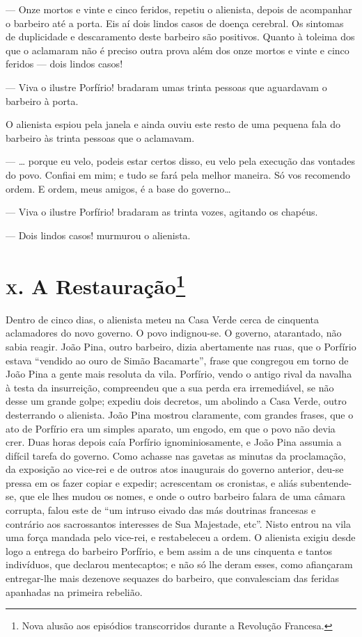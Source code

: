 --- Onze mortos e vinte e cinco feridos, repetiu o alienista, depois de
acompanhar o barbeiro até a porta. Eis aí dois lindos casos de doença
cerebral. Os sintomas de duplicidade e descaramento deste barbeiro são
positivos. Quanto à toleima dos que o aclamaram não é preciso outra
prova além dos onze mortos e vinte e cinco feridos --- dois lindos
casos!

--- Viva o ilustre Porfírio! bradaram umas trinta pessoas que aguardavam
o barbeiro à porta.

O alienista espiou pela janela e ainda ouviu este resto de uma pequena
fala do barbeiro às trinta pessoas que o aclamavam.

--- \ldots{} porque eu velo, podeis estar certos disso, eu velo pela
execução das vontades do povo. Confiai em mim; e tudo se fará pela
melhor maneira. Só vos recomendo ordem. E ordem, meus amigos, é a base
do governo\ldots{}

--- Viva o ilustre Porfírio! bradaram as trinta vozes, agitando os
chapéus.

--- Dois lindos casos! murmurou o alienista.

\chapter{\textsc{x.} A Restauração\footnote{Nova alusão aos episódios transcorridos
  durante a Revolução Francesa.}}

Dentro de cinco dias, o alienista meteu na Casa Verde cerca de cinquenta
aclamadores do novo governo. O povo indignou-se. O governo, atarantado,
não sabia reagir. João Pina, outro barbeiro, dizia abertamente nas ruas,
que o Porfírio estava ``vendido ao ouro de Simão Bacamarte'', frase que
congregou em torno de João Pina a gente mais resoluta da vila. Porfírio,
vendo o antigo rival da navalha à testa da insurreição, compreendeu que
a sua perda era irremediável, se não desse um grande golpe; expediu dois
decretos, um abolindo a Casa Verde, outro desterrando o alienista. João
Pina mostrou claramente, com grandes frases, que o ato de Porfírio era
um simples aparato, um engodo, em que o povo não devia crer. Duas horas
depois caía Porfírio ignominiosamente, e João Pina assumia a difícil
tarefa do governo. Como achasse nas gavetas as minutas da proclamação,
da exposição ao vice-rei e de outros atos inaugurais do governo
anterior, deu-se pressa em os fazer copiar e expedir; acrescentam os
cronistas, e aliás subentende-se, que ele lhes mudou os nomes, e onde o
outro barbeiro falara de uma câmara corrupta, falou este de ``um intruso
eivado das más doutrinas francesas e contrário aos sacrossantos
interesses de Sua Majestade, etc''. Nisto entrou na vila uma força
mandada pelo vice-rei, e restabeleceu a ordem. O alienista exigiu desde
logo a entrega do barbeiro Porfírio, e bem assim a de uns cinquenta e
tantos indivíduos, que declarou mentecaptos; e não só lhe deram esses,
como afiançaram entregar-lhe mais dezenove sequazes do barbeiro, que
convalesciam das feridas apanhadas na primeira rebelião.

